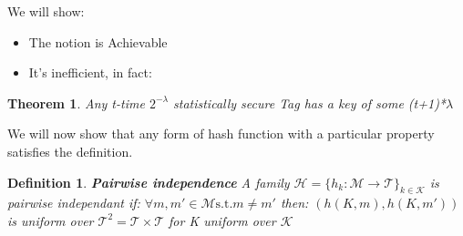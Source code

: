 \documentclass[11pt, a4paper]{article}
\newtheorem{thm}{Theorem}
\newtheorem{defn}{Definition}
\begin{document}
We will show:
\begin{itemize}
    \item The notion is Achievable
    \item It's inefficient, in fact:
\end{itemize}
\begin{thm}
    Any t-time $2^{-\lambda}$ statistically secure Tag has a key of some (t+1)*$\lambda$
\end{thm}
We will now show that any form of hash function with a particular property satisfies the definition.\\
\begin{defn}
    \textbf{Pairwise independence} A family $\mathcal{H} = \{h_k: \mathcal{M} \rightarrow \mathcal{T}\}_{k \in \mathcal{K}}$ is pairwise independant if: $\forall m,m' \in \mathcal{M} \text{s.t.} m \neq m'$ then:
    $(h(K,m),h(K,m'))$ is uniform over $\mathcal{T}^2 = \mathcal{T} \times \mathcal{T}$ for K uniform over $\mathcal{K}$
\end{defn}
\end{document}
